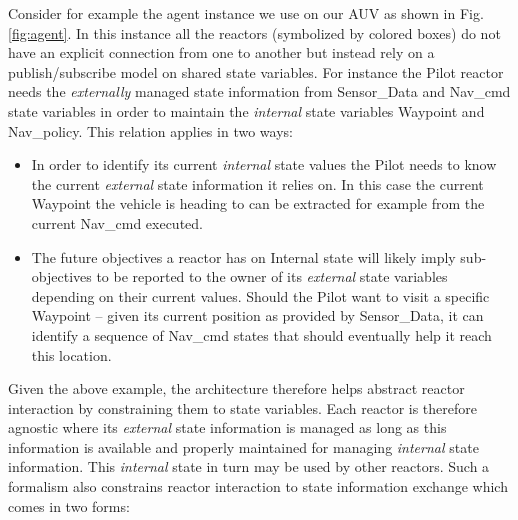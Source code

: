 Consider for example the \rx agent instance we use on our AUV as shown
in Fig. \ref{fig:agent}. In this instance all the reactors (symbolized
by colored boxes) do not have an explicit connection from one to
another but instead rely on a publish/subscribe model on shared state
variables. For instance the \textsf{Pilot} reactor needs the {\em
  externally} managed state information from \textsf{Sensor\_Data} and
\textsf{Nav\_cmd} state variables in order to maintain the
\emph{internal} state variables \textsf{Waypoint} and
\textsf{Nav\_policy}. This relation applies in two ways:

\begin{itemize}

\item In order to identify its current {\em internal} state values the
  \textsf{Pilot}  needs to know the
  current {\em external} state information it relies on. In this case
  the current \textsf{Waypoint} the vehicle is heading to can be
  extracted for example from the current \textsf{Nav\_cmd} executed.

\item The future objectives a reactor has on \textsf{Internal} state
  will likely imply sub-objectives to be reported to the owner of its
  {\em external} state variables depending on their current
  values. Should the \textsf{Pilot} want to visit a specific
  \textsf{Waypoint} -- given its current position as provided by
  \textsf{Sensor\_Data}, it can identify a sequence of
  \textsf{Nav\_cmd} states that should eventually help it reach this
  location. 

\end{itemize}

Given the above example, the \rx architecture therefore helps abstract
reactor interaction by constraining them to state variables. Each
reactor is therefore agnostic where its {\em external} state
information is managed as long as this information is available and
properly maintained for managing {\em internal} state
information. This {\em internal} state in turn may be used by other
reactors. Such a formalism also constrains reactor interaction to
state information exchange which comes in two forms:

